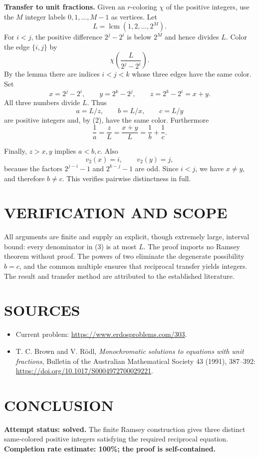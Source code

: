 \textbf{Transfer to unit fractions.} Given an $r$-coloring $\chi$ of the positive integers, use the $M$ integer labels $0,1,\ldots,M-1$ as vertices. Let
\[
L=\operatorname{lcm}(1,2,\ldots,2^M).
\]
For $i<j$, the positive difference $2^j-2^i$ is below $2^M$ and hence divides $L$. Color the edge $\{i,j\}$ by
\[
\chi\!\left(\frac L{2^j-2^i}\right).
\tag{2}
\]
By the lemma there are indices $i<j<k$ whose three edges have the same color. Set
\[
x=2^j-2^i,\qquad y=2^k-2^j,\qquad z=2^k-2^i=x+y.
\]
All three numbers divide $L$. Thus
\[
a=L/z,\qquad b=L/x,\qquad c=L/y
\tag{3}
\]
are positive integers and, by (2), have the same color. Furthermore
\[
\frac1a=\frac zL=\frac{x+y}L=\frac1b+\frac1c.
\]

Finally, $z>x,y$ implies $a<b,c$. Also
\[
v_2(x)=i,\qquad v_2(y)=j,
\]
because the factors $2^{j-i}-1$ and $2^{k-j}-1$ are odd. Since $i<j$, we have $x\neq y$, and therefore $b\neq c$. This verifies pairwise distinctness in full.

\section{VERIFICATION AND SCOPE}
All arguments are finite and supply an explicit, though extremely large, interval bound: every denominator in (3) is at most $L$. The proof imports no Ramsey theorem without proof. The powers of two eliminate the degenerate possibility $b=c$, and the common multiple ensures that reciprocal transfer yields integers. The result and transfer method are attributed to the established literature.

\section{SOURCES}
\begin{itemize}
\item Current problem: \url{https://www.erdosproblems.com/303}.
\item T. C. Brown and V. R\"odl, \emph{Monochromatic solutions to equations with unit fractions}, Bulletin of the Australian Mathematical Society 43 (1991), 387--392: \url{https://doi.org/10.1017/S0004972700029221}.
\end{itemize}
\section{CONCLUSION}
\textbf{Attempt status: solved.}
The finite Ramsey construction gives three distinct same-colored positive integers satisfying the required reciprocal equation.
\textbf{Completion rate estimate: 100\%; the proof is self-contained.}
